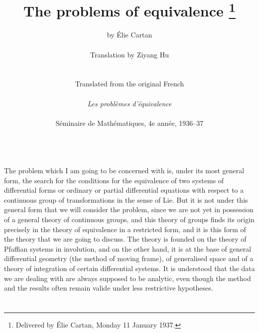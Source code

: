 \documentclass[leqno,11pt]{article}
\title{The problems of equivalence \footnote{Delivered by Élie Cartan, Monday 11 January 1937.}}
\author{by Élie Cartan\\         
\\
Translation by Ziyang Hu\\
\\
\\
Translated from the original French\\
\\
\emph{Les problèmes d'équivalence}\\ 
\\{Séminaire de Mathématiques, 4e année, 1936--37}
\\~
}%
\theoremstyle{shape1}
\theoremstyle{shape0}
\theoremstyle{shape2}
\theoremstyle{definition}
\begin{document}
\maketitle

The problem which I am going to be concerned with is, under its most general form, the search for the conditions for the equivalence of two systems of differential forms or ordinary or partial differential equations with respect to a continuous group of transformations in the sense of Lie. But it is not under this general form that we will consider the problem, since we are not yet in possession of a general theory of continuous groups, and this theory of groups finds its origin precisely in the theory of equivalence in a restricted form, and it is this form of the theory that we are going to discuss. The theory is founded on the theory of Pfaffian systems in involution, and on the other hand, it is at the base of general differential geometry (the method of moving frame), of generalised space and of a theory of integration of certain differential systems. It is understood that the data we are dealing with are always supposed to be analytic, even though the method and the results often remain valide under less restrictive hypotheses.

\section{}
\label{sec:1}
\end{document}
